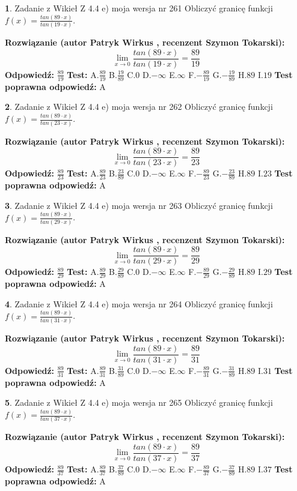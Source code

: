 \documentclass[12pt, a4paper]{article}
\theoremstyle{definition} %
\newtheorem{zad}{}
\newcommand{\zadStart}[1]{\begin{zad}#1\newline}
\newcommand{\zadStop}{\end{zad}}
\newcommand{\rozwStart}[2]{\noindent \textbf{Rozwiązanie (autor #1 , recenzent #2): }\newline}
\newcommand{\rozwStop}{\newline}
\newcommand{\odpStart}{\noindent \textbf{Odpowiedź:}\newline}
\newcommand{\odpStop}{\newline}
\newcommand{\testStart}{\noindent \textbf{Test:}\newline}
\newcommand{\testStop}{\newline}
\newcommand{\kluczStart}{\noindent \textbf{Test poprawna odpowiedź:}\newline}
\newcommand{\kluczStop}{\newline}
\begin{document}
\zadStart{Zadanie z Wikieł Z 4.4 e) moja wersja nr 261}
Obliczyć granicę funkcji $f(x)=\frac{tan(89\cdot x)}{tan(19\cdot x)}$.
\zadStop
\rozwStart{Patryk Wirkus}{Szymon Tokarski}
$$\lim\limits_{x\to 0}\frac{tan(89\cdot x)}{tan(19\cdot x)}=
\frac{89}{19}$$
\rozwStop
\odpStart
$\frac{89}{19}$
\odpStop
\testStart
A.$\frac{89}{19}$
B.$\frac{19}{89}$
C.$0$
D.$-\infty$
E.$\infty$
F.$-\frac{89}{19}$
G.$-\frac{19}{89}$
H.$89$
I.$19$
\testStop
\kluczStart
A
\kluczStop



\zadStart{Zadanie z Wikieł Z 4.4 e) moja wersja nr 262}
Obliczyć granicę funkcji $f(x)=\frac{tan(89\cdot x)}{tan(23\cdot x)}$.
\zadStop
\rozwStart{Patryk Wirkus}{Szymon Tokarski}
$$\lim\limits_{x\to 0}\frac{tan(89\cdot x)}{tan(23\cdot x)}=
\frac{89}{23}$$
\rozwStop
\odpStart
$\frac{89}{23}$
\odpStop
\testStart
A.$\frac{89}{23}$
B.$\frac{23}{89}$
C.$0$
D.$-\infty$
E.$\infty$
F.$-\frac{89}{23}$
G.$-\frac{23}{89}$
H.$89$
I.$23$
\testStop
\kluczStart
A
\kluczStop



\zadStart{Zadanie z Wikieł Z 4.4 e) moja wersja nr 263}
Obliczyć granicę funkcji $f(x)=\frac{tan(89\cdot x)}{tan(29\cdot x)}$.
\zadStop
\rozwStart{Patryk Wirkus}{Szymon Tokarski}
$$\lim\limits_{x\to 0}\frac{tan(89\cdot x)}{tan(29\cdot x)}=
\frac{89}{29}$$
\rozwStop
\odpStart
$\frac{89}{29}$
\odpStop
\testStart
A.$\frac{89}{29}$
B.$\frac{29}{89}$
C.$0$
D.$-\infty$
E.$\infty$
F.$-\frac{89}{29}$
G.$-\frac{29}{89}$
H.$89$
I.$29$
\testStop
\kluczStart
A
\kluczStop



\zadStart{Zadanie z Wikieł Z 4.4 e) moja wersja nr 264}
Obliczyć granicę funkcji $f(x)=\frac{tan(89\cdot x)}{tan(31\cdot x)}$.
\zadStop
\rozwStart{Patryk Wirkus}{Szymon Tokarski}
$$\lim\limits_{x\to 0}\frac{tan(89\cdot x)}{tan(31\cdot x)}=
\frac{89}{31}$$
\rozwStop
\odpStart
$\frac{89}{31}$
\odpStop
\testStart
A.$\frac{89}{31}$
B.$\frac{31}{89}$
C.$0$
D.$-\infty$
E.$\infty$
F.$-\frac{89}{31}$
G.$-\frac{31}{89}$
H.$89$
I.$31$
\testStop
\kluczStart
A
\kluczStop



\zadStart{Zadanie z Wikieł Z 4.4 e) moja wersja nr 265}
Obliczyć granicę funkcji $f(x)=\frac{tan(89\cdot x)}{tan(37\cdot x)}$.
\zadStop
\rozwStart{Patryk Wirkus}{Szymon Tokarski}
$$\lim\limits_{x\to 0}\frac{tan(89\cdot x)}{tan(37\cdot x)}=
\frac{89}{37}$$
\rozwStop
\odpStart
$\frac{89}{37}$
\odpStop
\testStart
A.$\frac{89}{37}$
B.$\frac{37}{89}$
C.$0$
D.$-\infty$
E.$\infty$
F.$-\frac{89}{37}$
G.$-\frac{37}{89}$
H.$89$
I.$37$
\testStop
\kluczStart
A
\kluczStop
\end{document}
